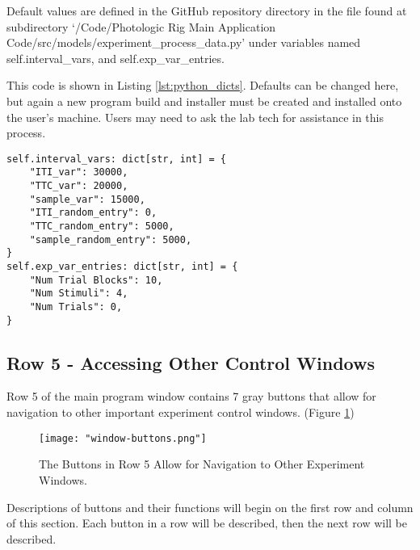 \documentclass{article}
\begin{document}
Default values are defined in the GitHub repository directory in the file found at subdirectory
`/Code/Photologic Rig Main Application Code/src/models/experiment\_process\_data.py'
under variables named self.interval\_vars, and self.exp\_var\_entries. 

This code is shown in Listing \ref{lst:python_dicts}. Defaults can be changed here, but again a new program build and installer must be created and 
installed onto the user's machine. Users may need to ask the lab tech for assistance in this process.

\begin{lstlisting}[style=mystyle, caption={Default values can be seen Above. Time-Related Interval Values are Separated from Other Values like Number of Trials.}, label={lst:python_dicts}]
self.interval_vars: dict[str, int] = {
    "ITI_var": 30000,
    "TTC_var": 20000,
    "sample_var": 15000,
    "ITI_random_entry": 0,
    "TTC_random_entry": 5000,
    "sample_random_entry": 5000,
}
self.exp_var_entries: dict[str, int] = {
    "Num Trial Blocks": 10,
    "Num Stimuli": 4,
    "Num Trials": 0,
}
\end{lstlisting}

\newpage
\subsection{Row 5 - Accessing Other Control Windows}
Row 5 of the main program window contains 7 gray buttons that allow for navigation to other important experiment control windows. 
(Figure \ref{fig:window-buttons})

\begin{figure}[h!]
        \centering
        \texttt{[image: "window-buttons.png"]}
        \caption{The Buttons in Row 5 Allow for Navigation to Other Experiment Windows.}
        \label{fig:window-buttons}
\end{figure}
\FloatBarrier

Descriptions of buttons and their functions will begin on the first row and column of this section. Each button in a row will be described, then the next
row will be described.
\end{document}
